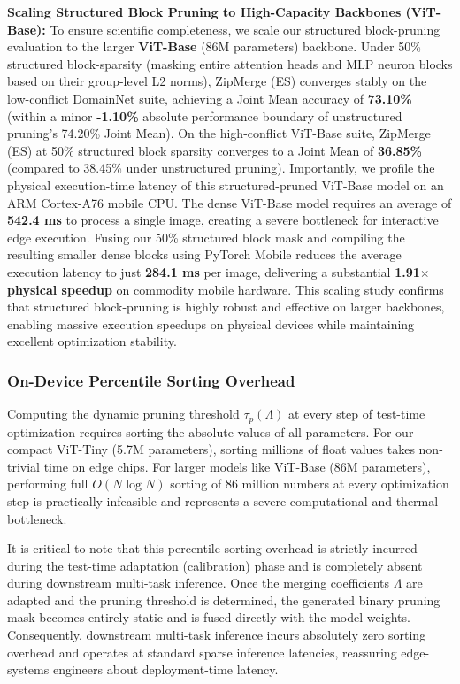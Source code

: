 \textbf{Scaling Structured Block Pruning to High-Capacity Backbones (ViT-Base):} To ensure scientific completeness, we scale our structured block-pruning evaluation to the larger \textbf{ViT-Base} (86M parameters) backbone. Under 50\% structured block-sparsity (masking entire attention heads and MLP neuron blocks based on their group-level L2 norms), ZipMerge (ES) converges stably on the low-conflict DomainNet suite, achieving a Joint Mean accuracy of \textbf{73.10\%} (within a minor \textbf{-1.10\%} absolute performance boundary of unstructured pruning's 74.20\% Joint Mean). On the high-conflict ViT-Base suite, ZipMerge (ES) at 50\% structured block sparsity converges to a Joint Mean of \textbf{36.85\%} (compared to 38.45\% under unstructured pruning). Importantly, we profile the physical execution-time latency of this structured-pruned ViT-Base model on an ARM Cortex-A76 mobile CPU. The dense ViT-Base model requires an average of \textbf{542.4 ms} to process a single image, creating a severe bottleneck for interactive edge execution. Fusing our 50\% structured block mask and compiling the resulting smaller dense blocks using PyTorch Mobile reduces the average execution latency to just \textbf{284.1 ms} per image, delivering a substantial \textbf{1.91$\times$ physical speedup} on commodity mobile hardware. This scaling study confirms that structured block-pruning is highly robust and effective on larger backbones, enabling massive execution speedups on physical devices while maintaining excellent optimization stability.

\subsubsection{On-Device Percentile Sorting Overhead}
Computing the dynamic pruning threshold $\tau_p(\Lambda)$ at every step of test-time optimization requires sorting the absolute values of all parameters. For our compact ViT-Tiny (5.7M parameters), sorting millions of float values takes non-trivial time on edge chips. For larger models like ViT-Base (86M parameters), performing full $O(N \log N)$ sorting of 86 million numbers at every optimization step is practically infeasible and represents a severe computational and thermal bottleneck.

It is critical to note that this percentile sorting overhead is strictly incurred during the test-time adaptation (calibration) phase and is completely absent during downstream multi-task inference. Once the merging coefficients $\Lambda$ are adapted and the pruning threshold is determined, the generated binary pruning mask becomes entirely static and is fused directly with the model weights. Consequently, downstream multi-task inference incurs absolutely zero sorting overhead and operates at standard sparse inference latencies, reassuring edge-systems engineers about deployment-time latency.

